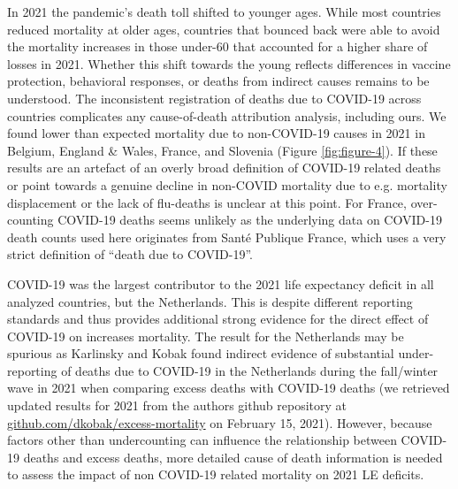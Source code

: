 \documentclass[12pt]{article}
\begin{document}
In 2021 the pandemic's death toll shifted to younger ages. While most countries reduced mortality at older ages, countries that bounced back were able to avoid the mortality increases in those under-60 that accounted for a higher share of losses in 2021. Whether this shift towards the young reflects differences in vaccine protection, behavioral responses, or deaths from indirect causes remains to be understood. The inconsistent registration of deaths due to COVID-19 across countries\cite{Garcia2021} complicates any cause-of-death attribution analysis, including ours. We found lower than expected mortality due to non-COVID-19 causes in 2021 in Belgium, England \& Wales, France, and Slovenia (Figure \ref{fig:figure-4}). If these results are an artefact of an overly broad definition of COVID-19 related deaths or point towards a genuine decline in non-COVID mortality due to e.g. mortality displacement or the lack of flu-deaths is unclear at this point. For France, over-counting COVID-19 deaths seems unlikely as the underlying data on COVID-19 death counts used here originates from Santé Publique France, which uses a very strict definition of ``death due to COVID-19''.\cite{Garcia2021}

COVID-19 was the largest contributor to the 2021 life expectancy deficit in all analyzed countries, but the Netherlands. This is despite different reporting standards and thus provides additional strong evidence for the direct effect of COVID-19 on increases mortality. The result for the Netherlands may be spurious as Karlinsky and Kobak\cite{Karlinsky2021} found indirect evidence of substantial under-reporting of deaths due to COVID-19 in the Netherlands during the fall/winter wave in 2021 when comparing excess deaths with COVID-19 deaths (we retrieved updated results for 2021 from the authors github repository at \href{https://github.com/dkobak/excess-mortality}{github.com/dkobak/excess-mortality} on February 15, 2021). However, because factors other than undercounting can influence the relationship between COVID-19 deaths and excess deaths, more detailed cause of death information is needed to assess the impact of non COVID-19 related mortality on 2021 LE deficits.
\end{document}
